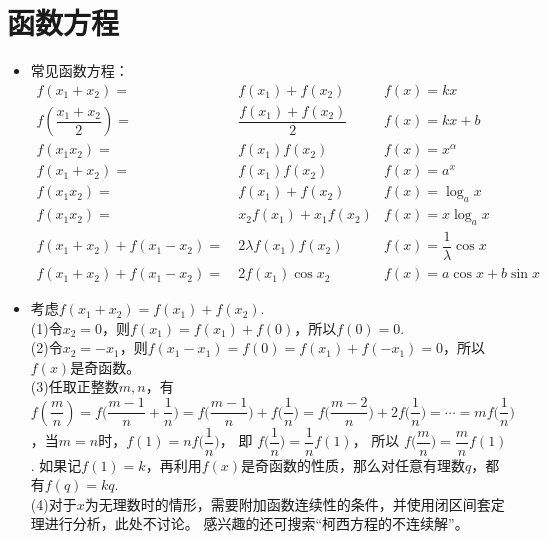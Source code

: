 \section{函数方程}
\begin{itemize}[leftmargin=\inteval{\myitemleftmargin}pt,itemsep=
   \inteval{\myitemitempsep}pt,topsep=\inteval{\myitemtopsep}pt]
\item 常见函数方程：
\begin{align*}
    f(x_1+x_2)=&\ f(x_1)+f(x_2)   	& f(x)=kx  \\
    f\left(\dfrac{x_1+x_2}{2}\right) =&\ \dfrac{f(x_1)+f(x_2)}{2}  & f(x)=kx+b \\
    f(x_1x_2)=&\ f(x_1)f(x_2)   	& f(x)=x^{\alpha} \\
    f(x_1+x_2)=&\ f(x_1)f(x_2)   	& f(x)=a^x \\
    f(x_1x_2)=&\ f(x_1)+f(x_2)   	& f(x)=\log_{a}x \\
    f(x_1x_2)=&\ x_2f(x_1)+x_1f(x_2)   	& f(x)=x\log_{a}x \\
    f(x_1+x_2)+f(x_1-x_2)=&\ 2\lambda f(x_1)f(x_2) & f(x)=\dfrac{1}{\lambda}\cos x \\
    f(x_1+x_2)+f(x_1-x_2)=&\ 2f(x_1)\cos x_2	& f(x)=a\cos x+b\sin x   
\end{align*}

\item 考虑$ f(x_1+x_2)=f(x_1)+f(x_2) $. \\
(1)令$ x_2=0 $，则$ f(x_1)=f(x_1)+f(0) $，所以$ f(0)=0 $. \\
(2)令$ x_2=-x_1 $，则$ f(x_1-x_1)=f(0)=f(x_1)+f(-x_1)=0 $，所以$ f(x) $是奇函数。\\
(3)任取正整数$ m,n $，有 $ f(\dfrac{m}{n})=f\Big(\dfrac{m-1}{n}+\dfrac{1}{n}\Big)=
f\Big(\dfrac{m-1}{n}\Big)+f\Big(\dfrac{1}{n}\Big)=
f\Big(\dfrac{m-2}{n}\Big)+2f\Big(\dfrac{1}{n}\Big)=
\cdots =mf\Big(\dfrac{1}{n}\Big)$，当$ m=n $时，$ f(1)=nf\Big(\dfrac{1}{n}\Big) $，
即 $ f\Big(\dfrac{1}{n}\Big)=\dfrac{1}{n}f(1) $，
所以 $f\Big(\dfrac{m}{n}\Big)=\dfrac{m}{n}f(1) $. 
如果记$ f(1)=k $，再利用$ f(x) $是奇函数的性质，那么对任意有理数$ q $，都有$ f(q)=kq $. \\
(4)对于$ x $为无理数时的情形，需要附加函数连续性的条件，并使用闭区间套定理进行分析，此处不讨论。
感兴趣的还可搜索“柯西方程的不连续解”。


\end{itemize}
